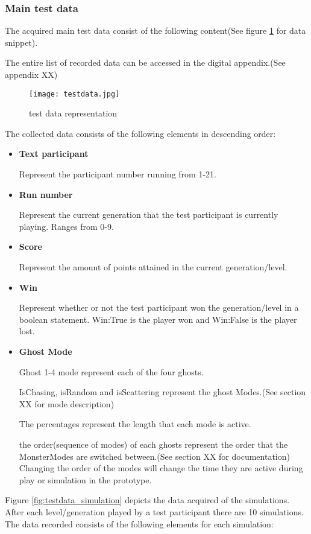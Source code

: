 \subsubsection{Main test data}
The acquired main test data consist of the following content(See figure \ref{fig:testdata} for data snippet).

The entire list of recorded data can be accessed in the digital appendix.(See appendix XX)

\begin{figure}[!htbp]
\centering
\texttt{[image: testdata.jpg]}
\caption{test data representation}
\label{fig:testdata}
\end{figure}


\newpage

The collected data consists of the following elements in descending order:

\begin{itemize}
\item  \textbf{Text participant}

Represent the participant number running from 1-21.
\item  \textbf{Run number}

Represent the current generation that the test participant is currently playing. Ranges from 0-9.
\item  \textbf{Score}

Represent the amount of points attained in the current generation/level.
\item  \textbf{Win}

Represent whether or not the test participant won the generation/level in a boolean statement. Win:True is the player won and Win:False is the player lost.
\item  \textbf{Ghost Mode}

Ghost 1-4 mode represent each of the four ghosts.


IsChasing, isRandom and isScattering represent the ghost Modes.(See section XX for mode description)

The percentages represent the length that each mode is active.

the order(sequence of modes) of each ghosts represent the order that the MonsterModes are switched between.(See section XX for documentation) Changing the order of the modes will change the time they are active during play or simulation in the prototype.
\end{itemize}

\newpage
Figure \ref{fig:testdata_simulation} depicts the data acquired of the simulations. After each level/generation played by a test participant there are 10 simulations.
The data recorded consists of the following elements for each simulation:

